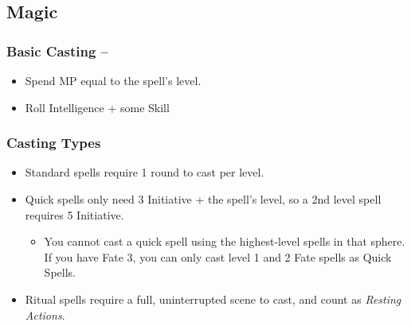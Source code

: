 \begin{multicols}{2}
\begin{itemize}
\end{itemize}

\subsection{Magic}

\subsubsection{Basic Casting -- \pageref{basiccasting}}

\begin{itemize}

	\item{Spend MP equal to the spell's level.}
	\item{Roll Intelligence + some Skill}

\end{itemize}

\subsubsection{Casting Types}

\begin{itemize}

	\item{Standard spells require 1 round to cast per level.}
	\item{Quick spells only need 3 Initiative + the spell's level, so a 2nd level spell requires 5 Initiative.}
	\begin{itemize}
		\item{You cannot cast a quick spell using the highest-level spells in that sphere.  If you have Fate 3, you can only cast level 1 and 2 Fate spells as Quick Spells.}
	\end{itemize}
	\item{Ritual spells require a full, uninterrupted scene to cast, and count as \textit{Resting Actions}.}

\end{itemize}

\end{multicols}
